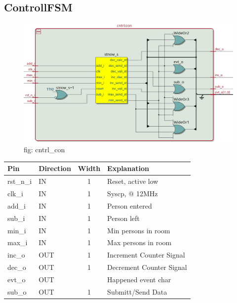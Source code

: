 \documentclass[12pt,a4 paper] {report}
\begin{document}
\subsection{ControllFSM}
\begin{figure}[h]
	\centering	
	\includegraphics[scale=0.3]{../png/cntrl_con.png}
	\newline
	fig: cntrl\_con \\
\end{figure}
\begin{center}
	\begin{tabular}{| p{2cm} | p{2cm} | c| p{4cm} |}
		\hline
		Pin & Direction & Width & Explanation\\
		\hline	
rst\_n\_i & IN & 1 & Reset, active low \\
\hline
clk\_i   & IN  &  1  & Syscp, @ 12MHz\\
\hline
add\_i   & IN  &   1  &         Person entered\\
\hline
sub\_i   & IN  &    1  &              Person left\\
\hline
min\_i   & IN  &     1  &                Min persons in room\\
\hline
max\_i   & IN  &      1  &               Max persons in room\\
\hline
inc\_o   & OUT &       1  &             Increment Counter Signal\\
\hline
dec\_o   & OUT &        1  &             Decrement Counter Signal\\
\hline
evt\_o   & OUT &		 & Happened event char\\
\hline
sub\_o   & OUT & 1  &     Submitt/Send Data\\
\hline
	\end{tabular}
\end{center}
\newpage
\end{document}
